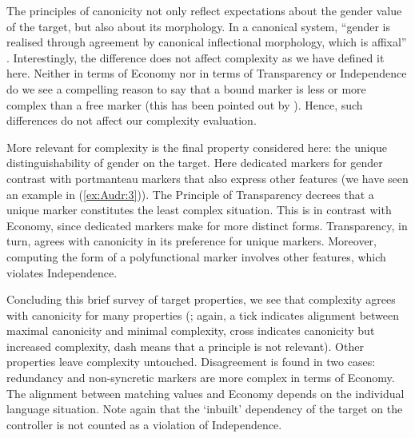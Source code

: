 \documentclass[output=collectionpaper]{langsci/langscibook}
\begin{document}
The principles of canonicity not only reflect expectations about the gender value of the target, but also about its morphology. In a canonical system, ``gender is realised through agreement by canonical inflectional morphology, which is affixal'' \citep[509]{Corbett2016}. Interestingly, the difference does not affect complexity as we have defined it here. Neither in terms of Economy nor in terms of Transparency or Independence do we see a compelling reason to say that a bound marker is less or more complex than a free marker (this has been pointed out by \citealt{Leufkens2014}). Hence, such differences do not affect our complexity evaluation.

\largerpage
More relevant for complexity is the final property considered here: the unique distinguishability of gender on the target. Here dedicated markers for gender contrast with portmanteau markers that also express other features (we have seen an example in (\ref{ex:Audr:3})). The Principle of Transparency decrees that a unique marker constitutes the least complex situation. This is in contrast with Economy, since dedicated markers make for more distinct forms. Transparency, in turn, agrees with canonicity in its preference for unique markers. Moreover, computing the form of a polyfunctional marker involves other features, which violates Independence.

Concluding this brief survey of target properties, we see that complexity agrees with canonicity for many properties (; again, a tick indicates alignment between maximal canonicity and minimal complexity, cross indicates canonicity but increased complexity, dash means that a principle is not relevant). Other properties leave complexity untouched. Disagreement is found in two cases: redundancy and non-syncretic markers are more complex in terms of Economy. The alignment between matching values and Economy depends on the individual language situation. Note again that the `inbuilt' dependency of the target on the controller is not counted as a violation of Independence.
\end{document}
